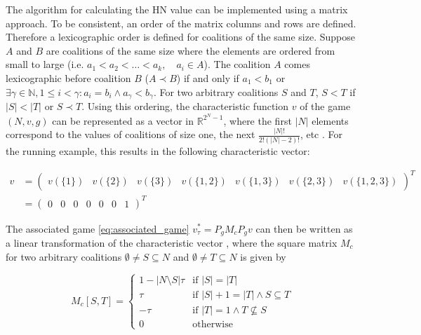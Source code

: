 The algorithm for calculating the HN value can be implemented using a matrix approach.
To be consistent, an order of the matrix columns and rows are defined. Therefore a lexicographic order is defined
for coalitions of the same size. Suppose $A$ and $B$ are coalitions of the same size where the elements are ordered
from small to large (i.e. $a_1 < a_2 < \dots < a_k, \quad a_i \in A$). The coalition $A$ comes lexicographic
before coalition $B$ ($A \prec B$) if and only if $a_1 < b_1$ or $\exists \gamma \in \mathbb{N}, 1 \le i < \gamma: a_i = b_i \land a_\gamma < b_\gamma$.
For two arbitrary coalitions $S$ and $T$, $S < T$ if $|S| < |T|$ or $S \prec T$. 
Using this ordering, the characteristic function $v$ of the game $(N, v, g)$ 
can be represented as a vector in $\mathbb{R}^{2^N - 1}$, where the first $|N|$ elements 
correspond to the values of coalitions of size one, the next $\frac{|N|!}{2!(|N| - 2)!}$, etc . 
For the running example, this results in the following characteristic vector:


\begin{equation}
    \begin{aligned}
        v &= \begin{pmatrix}
        v(\{1\}) & v(\{2\}) & v(\{3\}) & v(\{1, 2\}) & v(\{1, 3\}) & v(\{2, 3\})& v(\{1, 2, 3\})
    \end{pmatrix}^T \\
    &= \begin{pmatrix}
      0 & 0 & 0 & 0 & 0 & 0 & 1
    \end{pmatrix}^T 
    \end{aligned}
\end{equation}


The associated game
\cref{eq:associated_game} $v^*_\tau = P_g M_c P_g v$ can then be written as a linear transformation of the characteristic vector
, where the square matrix $M_c$ for two arbitrary coalitions $\emptyset \ne S \subseteq N$
and $\emptyset \ne T \subseteq N$ is given by\cite{hamiache_associated_2020,hamiache2010matrix}


\begin{equation}
	M_c[S, T] =
	\begin{cases}
		1 - |N \setminus S| \tau & \text{if } |S| = |T|                         \\
		\tau                     & \text{if } |S| + 1 = |T| \land S \subseteq T \\
		-\tau                    & \text{if } |T| = 1  \land T \not \subseteq S \\
		0                        & \text{otherwise}
	\end{cases}
\end{equation}


